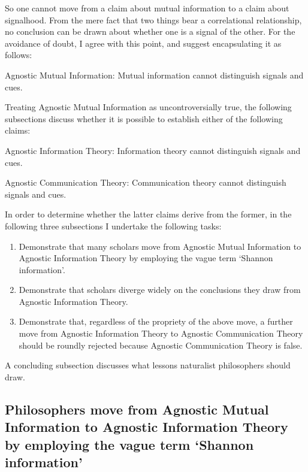 So one cannot move from a claim about mutual information to a claim about signalhood.
From the mere fact that two things bear a correlational relationship, no conclusion can be drawn about whether one is a signal of the other.
For the avoidance of doubt, I agree with this point, and suggest encapsulating it as follows:

\begin{myquote}
{\sc Agnostic Mutual Information}: Mutual information cannot distinguish signals and cues.
\end{myquote}

\noindent Treating {\sc Agnostic Mutual Information} as uncontroversially true, the following subsections discuss whether it is possible to establish either of the following claims:

\begin{myquote}
{\sc Agnostic Information Theory}: Information theory cannot distinguish signals and cues.
\end{myquote}

\begin{myquote}
{\sc Agnostic Communication Theory}: Communication theory cannot distinguish signals and cues.
\end{myquote}

\noindent In order to determine whether the latter claims derive from the former, in the following three subsections I undertake the following tasks:

\begin{enumerate}
    \item Demonstrate that many scholars move from {\sc Agnostic Mutual Information} to {\sc Agnostic Information Theory} by employing the vague term `Shannon information'.
    \item Demonstrate that scholars diverge widely on the conclusions they draw from {\sc Agnostic Information Theory}.
    \item Demonstrate that, regardless of the propriety of the above move, a further move from {\sc Agnostic Information Theory} to {\sc Agnostic Communication Theory} should be roundly rejected because {\sc Agnostic Communication Theory} is false.
\end{enumerate}

\noindent A concluding subsection discusses what lessons naturalist philosophers should draw.

\subsection{\sloppy Philosophers move from {\sc Agnostic Mutual Information} to {\sc Agnostic Information Theory} by employing the vague term `Shannon information'}

